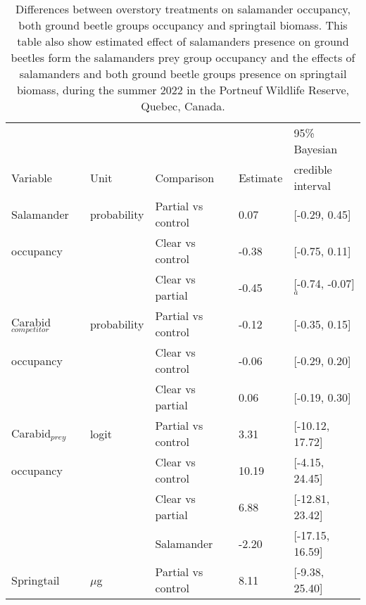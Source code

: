 \vspace{10pt}

\begin{table}[ht]
  \centering
  \caption[Differences between overstory treatments on the forest soil fauna.]
  {Differences between overstory treatments on salamander occupancy, both ground beetle groups occupancy and springtail biomass. 
  This table also show estimated effect of salamanders presence on ground beetles form the salamanders prey group occupancy 
  and the effects of salamanders and both ground beetle groups presence on springtail biomass, during the summer 2022 in the Portneuf Wildlife Reserve, Quebec, Canada.}
  \label{tab:overstorysp}
  \begin{tabular}{lllll} 
      \hline
      &&&&95\% Bayesian \\
      Variable&Unit& Comparison & Estimate &  credible interval \\ [0.5ex] 
      \hline     
      Salamander           &probability& Partial vs control & \hspace{1mm}0.07 & [-0.29, 0.45] \\ 
      occupancy       && Clear vs control  & -0.38 & [-0.75, 0.11] \\ 
                          && Clear vs partial  & -0.45 & [-0.74, -0.07]$^{a}$ \\       
      Carabid$_{competitor}$ &probability& Partial vs control & -0.12 & [-0.35, 0.15] \\
      occupancy       && Clear vs control  & -0.06 & [-0.29, 0.20] \\ 
                          && Clear vs partial  & \hspace{1mm}0.06 & [-0.19, 0.30] \\ 
      Carabid$_{prey}$    &logit& Partial vs control & \hspace{1mm}3.31 & [-10.12, 17.72] \\
      occupancy             && Clear vs control  & \hspace{1mm}10.19 & [-4.15, 24.45] \\ 
                          && Clear vs partial  & \hspace{1mm}6.88 & [-12.81, 23.42] \\  
                          && Salamander        & -2.20 & [-17.15, 16.59] \\  
      Springtail          &$\mu$g& Partial vs control & \hspace{1mm}8.11 & [-9.38, 25.40] \\

\end{tabular}
\end{table}
